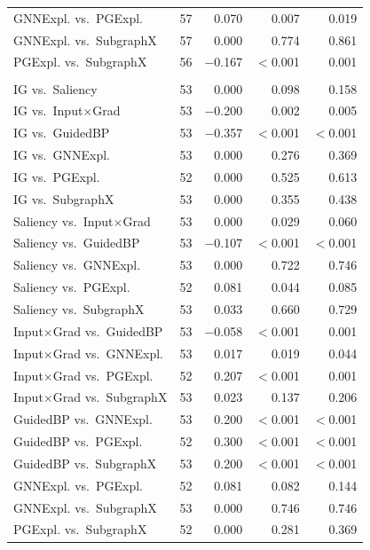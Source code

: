 \begin{table}[t]
\begin{tabular}{lrrrr}
GNNExpl. vs.\ PGExpl. & 57 & 0.070 & 0.007 & 0.019 \\
GNNExpl. vs.\ SubgraphX & 57 & 0.000 & 0.774 & 0.861 \\
PGExpl. vs.\ SubgraphX & 56 & $-$0.167 & $<$0.001 & 0.001 \\
\addlinespace[3pt]
\multicolumn{5}{l}{\itshape MUTAG, GINE, scaffold split} \\
\addlinespace[1pt]
IG vs.\ Saliency & 53 & 0.000 & 0.098 & 0.158 \\
IG vs.\ Input$\times$Grad & 53 & $-$0.200 & 0.002 & 0.005 \\
IG vs.\ GuidedBP & 53 & $-$0.357 & $<$0.001 & $<$0.001 \\
IG vs.\ GNNExpl. & 53 & 0.000 & 0.276 & 0.369 \\
IG vs.\ PGExpl. & 52 & 0.000 & 0.525 & 0.613 \\
IG vs.\ SubgraphX & 53 & 0.000 & 0.355 & 0.438 \\
Saliency vs.\ Input$\times$Grad & 53 & 0.000 & 0.029 & 0.060 \\
Saliency vs.\ GuidedBP & 53 & $-$0.107 & $<$0.001 & $<$0.001 \\
Saliency vs.\ GNNExpl. & 53 & 0.000 & 0.722 & 0.746 \\
Saliency vs.\ PGExpl. & 52 & 0.081 & 0.044 & 0.085 \\
Saliency vs.\ SubgraphX & 53 & 0.033 & 0.660 & 0.729 \\
Input$\times$Grad vs.\ GuidedBP & 53 & $-$0.058 & $<$0.001 & 0.001 \\
Input$\times$Grad vs.\ GNNExpl. & 53 & 0.017 & 0.019 & 0.044 \\
Input$\times$Grad vs.\ PGExpl. & 52 & 0.207 & $<$0.001 & 0.001 \\
Input$\times$Grad vs.\ SubgraphX & 53 & 0.023 & 0.137 & 0.206 \\
GuidedBP vs.\ GNNExpl. & 53 & 0.200 & $<$0.001 & $<$0.001 \\
GuidedBP vs.\ PGExpl. & 52 & 0.300 & $<$0.001 & $<$0.001 \\
GuidedBP vs.\ SubgraphX & 53 & 0.200 & $<$0.001 & $<$0.001 \\
GNNExpl. vs.\ PGExpl. & 52 & 0.081 & 0.082 & 0.144 \\
GNNExpl. vs.\ SubgraphX & 53 & 0.000 & 0.746 & 0.746 \\
PGExpl. vs.\ SubgraphX & 52 & 0.000 & 0.281 & 0.369 \\
\bottomrule
\end{tabular}
\end{table}

